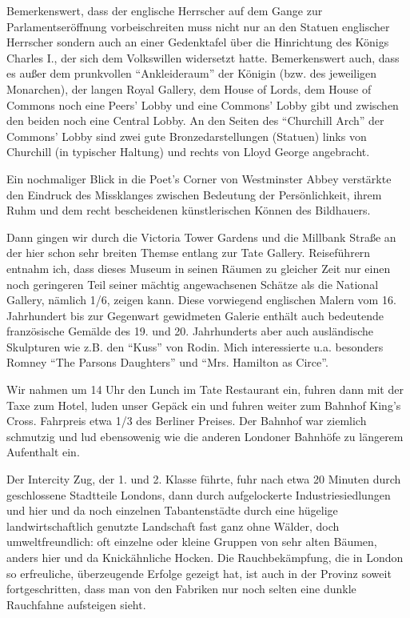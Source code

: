 \documentclass[a5paper,pagesize,10pt,twoside=true]{scrbook}
\begin{document}
Bemerkenswert, dass der englische Herrscher auf dem Gange zur Parlamentseröffnung vorbeischreiten muss nicht nur an den Statuen englischer Herrscher sondern auch an einer Gedenktafel über die Hinrichtung des Königs Charles I., der sich dem Volkswillen widersetzt hatte. Bemerkenswert auch, dass es außer dem prunkvollen \enquote{Ankleideraum} der Königin (bzw. des jeweiligen Monarchen), der langen Royal Gallery, dem House of Lords, dem House of Commons noch eine Peers' Lobby und eine Commons' Lobby gibt und zwischen den beiden noch eine Central Lobby. An den Seiten des \enquote{Churchill Arch} der Commons' Lobby sind zwei gute Bronzedarstellungen (Statuen) links von Churchill (in typischer Haltung) und rechts von Lloyd George angebracht.

Ein nochmaliger Blick in die Poet's Corner von Westminster Abbey verstärkte den Eindruck des Missklanges zwischen Bedeutung der Persönlichkeit, ihrem Ruhm und dem recht bescheidenen künstlerischen Können des Bildhauers.

Dann gingen wir durch die Victoria Tower Gardens und die Millbank Straße an der hier schon sehr breiten Themse entlang zur Tate Gallery. Reiseführern entnahm ich, dass dieses Museum in seinen Räumen zu gleicher Zeit nur einen noch geringeren Teil seiner mächtig angewachsenen Schätze als die National Gallery, nämlich 1/6, zeigen kann. Diese vorwiegend englischen Malern vom 16. Jahrhundert bis zur Gegenwart gewidmeten Galerie enthält auch bedeutende französische Gemälde des 19. und 20. Jahrhunderts aber auch ausländische Skulpturen wie z.B. den \enquote{Kuss} von Rodin. Mich interessierte u.a. besonders Romney \enquote{The Parsons Daughters} und \enquote{Mrs. Hamilton as Circe}.

Wir nahmen um 14 Uhr den Lunch im Tate Restaurant ein, fuhren dann mit der Taxe zum Hotel, luden unser Gepäck ein und fuhren weiter zum Bahnhof King's Cross. Fahrpreis etwa 1/3 des Berliner Preises. Der Bahnhof war ziemlich schmutzig und lud ebensowenig wie die anderen Londoner Bahnhöfe zu längerem Aufenthalt ein.

Der Intercity Zug, der 1. und 2. Klasse führte, fuhr nach etwa 20 Minuten durch geschlossene Stadtteile Londons, dann durch aufgelockerte Industriesiedlungen und hier und da noch einzelnen Tabantenstädte durch eine hügelige landwirtschaftlich genutzte Landschaft fast ganz ohne Wälder, doch umweltfreundlich: oft einzelne oder kleine Gruppen von sehr alten Bäumen, anders hier und da Knickähnliche Hocken. Die Rauchbekämpfung, die in London so erfreuliche, überzeugende Erfolge gezeigt hat, ist auch in der Provinz soweit fortgeschritten, dass man von den Fabriken nur noch selten eine dunkle Rauchfahne aufsteigen sieht.
\end{document}
